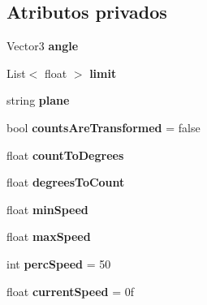 \subsection*{Atributos privados}
\begin{DoxyCompactItemize}
\item 
\mbox{\label{class_articulation_abd23ea47f7f82fc1137a2a67511ca9bb}} 
Vector3 {\bfseries angle}
\item 
\mbox{\label{class_articulation_abbe4425e0bfa1964ced48a025a50d326}} 
List$<$ float $>$ {\bfseries limit}
\item 
\mbox{\label{class_articulation_a87fba785eed8db50cb379536ce7ef168}} 
string {\bfseries plane}
\item 
\mbox{\label{class_articulation_a1dc922cba9a344d7769cf60a33733c79}} 
bool {\bfseries counts\+Are\+Transformed} = false
\item 
\mbox{\label{class_articulation_a6364c5edba29a5b74a587be7f0b6e320}} 
float {\bfseries count\+To\+Degrees}
\item 
\mbox{\label{class_articulation_ad2cbeae71ddd9f987dae8f6ece7d0b78}} 
float {\bfseries degrees\+To\+Count}
\item 
\mbox{\label{class_articulation_a9f180a4dd504e1e824b0260195540569}} 
float {\bfseries min\+Speed}
\item 
\mbox{\label{class_articulation_a64600f7d0fb637860d01de29536ebe20}} 
float {\bfseries max\+Speed}
\item 
\mbox{\label{class_articulation_abb6ffedc22b45cd27a59c23124227b0e}} 
int {\bfseries perc\+Speed} = 50
\item 
\mbox{\label{class_articulation_a1522e4342b1ac429b245e84d805d34d8}} 
float {\bfseries current\+Speed} = 0f
\end{DoxyCompactItemize}


